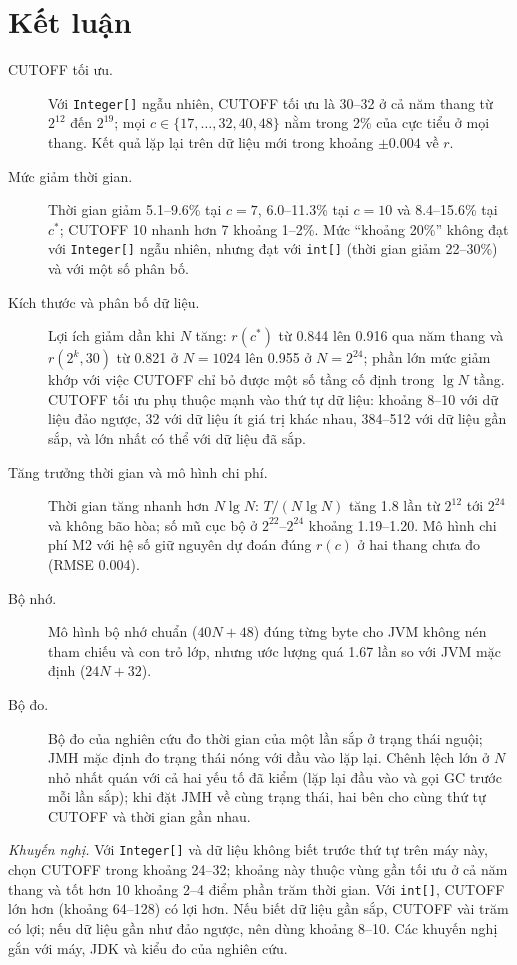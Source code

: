 \documentclass[12pt,a4paper]{article}
\begin{document}
\section{Kết luận}\label{sec:8}
\begin{description}
\item[CUTOFF tối ưu.] Với \texttt{Integer[]} ngẫu nhiên, CUTOFF tối ưu là 30--32 ở cả năm thang từ $2^{12}$ đến $2^{19}$; mọi $c \in \{17, \dots, 32, 40, 48\}$ nằm trong 2\% của cực tiểu ở mọi thang. Kết quả lặp lại trên dữ liệu mới trong khoảng $\pm 0.004$ về $r$.
\item[Mức giảm thời gian.] Thời gian giảm 5.1--9.6\% tại $c = 7$, 6.0--11.3\% tại $c = 10$ và 8.4--15.6\% tại $c^*$; CUTOFF 10 nhanh hơn 7 khoảng 1--2\%. Mức ``khoảng 20\%'' không đạt với \texttt{Integer[]} ngẫu nhiên, nhưng đạt với \texttt{int[]} (thời gian giảm 22--30\%) và với một số phân bố.
\item[Kích thước và phân bố dữ liệu.] Lợi ích giảm dần khi $N$ tăng: $r(c^*)$ từ 0.844 lên 0.916 qua năm thang và $r(2^k, 30)$ từ 0.821 ở $N = 1024$ lên 0.955 ở $N = 2^{24}$; phần lớn mức giảm khớp với việc CUTOFF chỉ bỏ được một số tầng cố định trong $\lg N$ tầng. CUTOFF tối ưu phụ thuộc mạnh vào thứ tự dữ liệu: khoảng 8--10 với dữ liệu đảo ngược, 32 với dữ liệu ít giá trị khác nhau, 384--512 với dữ liệu gần sắp, và lớn nhất có thể với dữ liệu đã sắp.
\item[Tăng trưởng thời gian và mô hình chi phí.] Thời gian tăng nhanh hơn $N \lg N$: $T/(N \lg N)$ tăng 1.8 lần từ $2^{12}$ tới $2^{24}$ và không bão hòa; số mũ cục bộ ở $2^{22}$--$2^{24}$ khoảng 1.19--1.20. Mô hình chi phí M2 với hệ số giữ nguyên dự đoán đúng $r(c)$ ở hai thang chưa đo (RMSE 0.004).
\item[Bộ nhớ.] Mô hình bộ nhớ chuẩn ($40N + 48$) đúng từng byte cho JVM không nén tham chiếu và con trỏ lớp, nhưng ước lượng quá 1.67 lần so với JVM mặc định ($24N + 32$).
\item[Bộ đo.] Bộ đo của nghiên cứu đo thời gian của một lần sắp ở trạng thái nguội; JMH mặc định đo trạng thái nóng với đầu vào lặp lại. Chênh lệch lớn ở $N$ nhỏ nhất quán với cả hai yếu tố đã kiểm (lặp lại đầu vào và gọi GC trước mỗi lần sắp); khi đặt JMH về cùng trạng thái, hai bên cho cùng thứ tự CUTOFF và thời gian gần nhau.
\end{description}

\emph{Khuyến nghị.} Với \texttt{Integer[]} và dữ liệu không biết trước thứ tự trên máy này, chọn CUTOFF trong khoảng 24--32; khoảng này thuộc vùng gần tối ưu ở cả năm thang và tốt hơn 10 khoảng 2--4 điểm phần trăm thời gian. Với \texttt{int[]}, CUTOFF lớn hơn (khoảng 64--128) có lợi hơn. Nếu biết dữ liệu gần sắp, CUTOFF vài trăm có lợi; nếu dữ liệu gần như đảo ngược, nên dùng khoảng 8--10. Các khuyến nghị gắn với máy, JDK và kiểu đo của nghiên cứu.
\end{document}
